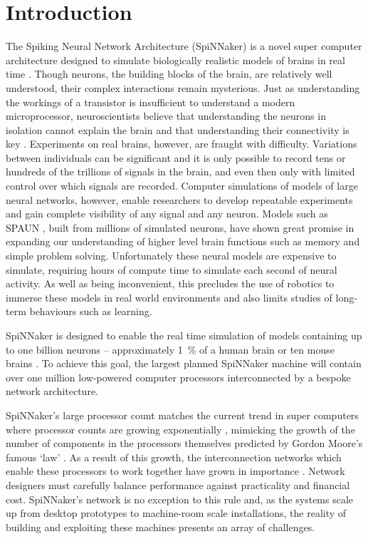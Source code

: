\chapter{Introduction}

\label{sec:introduction}

%

The Spiking Neural Network Architecture (SpiNNaker) is a novel super computer
architecture designed to simulate biologically realistic models of brains in
real time \cite{furber07}. Though neurons, the building blocks of the brain,
are relatively well understood, their complex interactions remain mysterious.
Just as understanding the workings of a transistor is insufficient to
understand a modern microprocessor, neuroscientists believe that understanding
the neurons in isolation cannot explain the brain and that understanding their
connectivity is key \cite{eliasmith13,eliasmith14}. Experiments on real brains,
however, are fraught with difficulty. Variations between individuals can be
significant and it is only possible to record tens or hundreds of the trillions
of signals in the brain, and even then only with limited control over which
signals are recorded. Computer simulations of models of large neural networks,
however, enable researchers to develop repeatable experiments and gain complete
visibility of any signal and any neuron. Models such as SPAUN
\cite{eliasmith12}, built from millions of simulated neurons, have shown great
promise in expanding our understanding of higher level brain functions such as
memory and simple problem solving.  Unfortunately these neural models are
expensive to simulate, requiring hours of compute time to simulate each second
of neural activity. As well as being inconvenient, this precludes the use of
robotics to immerse these models in real world environments and also limits
studies of long-term behaviours such as learning.

SpiNNaker is designed to enable the real time simulation of models containing
up to one billion neurons -- approximately \SI{1}{\percent} of a human brain or
ten mouse brains \cite{furber06}. To achieve this goal, the largest planned
SpiNNaker machine will contain over one million low-powered computer processors
interconnected by a bespoke network architecture.

SpiNNaker's large processor count matches the current trend in super computers
where processor counts are growing exponentially \cite{meuer16j}, mimicking the
growth of the number of components in the processors themselves predicted by
Gordon Moore's famous `law' \cite{moore75}. As a result of this growth, the
interconnection networks which enable these processors to work together have
grown in importance \cite{dally01}. Network designers must carefully balance
performance against practicality and financial cost.  SpiNNaker's network is no
exception to this rule and, as the systems scale up from desktop prototypes to
machine-room scale installations, the reality of building and exploiting these
machines presents an array of challenges.

